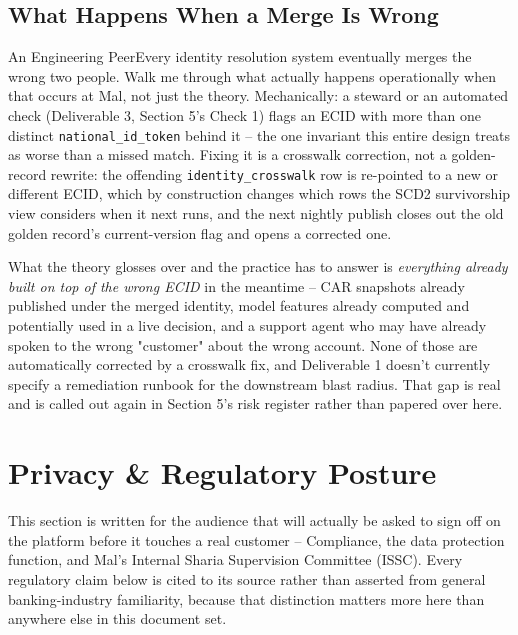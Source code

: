 \documentclass[11pt]{article}
\begin{document}
\subsection{What Happens When a Merge Is Wrong}
\begin{stakeholderq}{An Engineering Peer}{Every identity resolution system eventually merges the wrong two people. Walk me through what actually happens operationally when that occurs at Mal, not just the theory.}
Mechanically: a steward or an automated check (Deliverable 3, Section 5's Check 1) flags an ECID with more than one distinct \texttt{national\_id\_token} behind it -- the one invariant this entire design treats as worse than a missed match. Fixing it is a crosswalk correction, not a golden-record rewrite: the offending \texttt{identity\_crosswalk} row is re-pointed to a new or different ECID, which by construction changes which rows the SCD2 survivorship view considers when it next runs, and the next nightly publish closes out the old golden record's current-version flag and opens a corrected one.

What the theory glosses over and the practice has to answer is \emph{everything already built on top of the wrong ECID} in the meantime -- CAR snapshots already published under the merged identity, model features already computed and potentially used in a live decision, and a support agent who may have already spoken to the wrong "customer" about the wrong account. None of those are automatically corrected by a crosswalk fix, and Deliverable 1 doesn't currently specify a remediation runbook for the downstream blast radius. That gap is real and is called out again in Section 5's risk register rather than papered over here.
\end{stakeholderq}

\section{Privacy \& Regulatory Posture}
\label{sec:privacy}
This section is written for the audience that will actually be asked to sign off on the platform before it touches a real customer -- Compliance, the data protection function, and Mal's Internal Sharia Supervision Committee (ISSC). Every regulatory claim below is cited to its source rather than asserted from general banking-industry familiarity, because that distinction matters more here than anywhere else in this document set.
\end{document}
